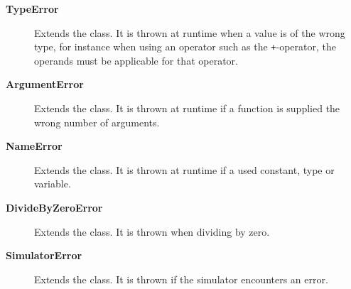\begin{description}
\item[\textbf{TypeError}] Extends the  class. It is
  thrown at runtime when a value is of the wrong type, for instance when using
  an operator such as the \texttt{+}-operator, the operands must be applicable
  for that operator.

\item[\textbf{ArgumentError}] Extends the  class. It is
  thrown at runtime if a function is supplied the wrong number of arguments.

\item[\textbf{NameError}] Extends the  class. It is
  thrown at runtime if a used constant, type or variable.

\item[\textbf{DivideByZeroError}] Extends the  class. It
  is thrown when dividing by zero.

\item[\textbf{SimulatorError}] Extends the  class. It is thrown
  if the simulator encounters an error.
\end{description}

